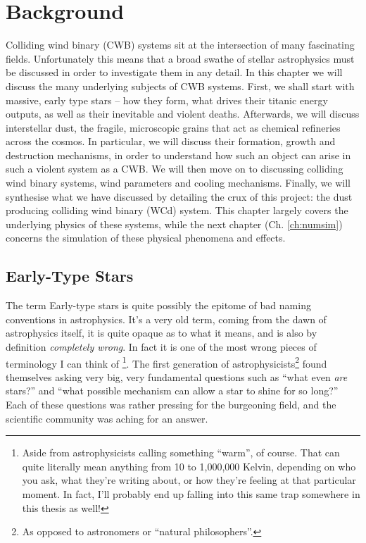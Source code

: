 \chapter{Background}
\label{ch:background}

Colliding wind binary (CWB) systems sit at the intersection of many fascinating fields.
Unfortunately this means that a broad swathe of stellar astrophysics must be discussed in order to investigate them in any detail.
In this chapter we will discuss the many underlying subjects of CWB systems.
First, we shall start with massive, early type stars -- how they form, what drives their titanic energy outputs, as well as their inevitable and violent deaths.
Afterwards, we will discuss interstellar dust, the fragile, microscopic grains that act as chemical refineries across the cosmos.
In particular, we will discuss their formation, growth and destruction mechanisms, in order to understand how such an object can arise in such a violent system as a CWB.
We will then move on to discussing colliding wind binary systems, wind parameters and cooling mechanisms.
Finally, we will synthesise what we have discussed by detailing the crux of this project: the dust producing colliding wind binary (WCd) system.
This chapter largely covers the underlying physics of these systems, while the next chapter (Ch. \ref{ch:numsim}) concerns the simulation of these physical phenomena and effects. 

\section{Early-Type Stars}
\label{sec:earlytype}
\label{sec:obtype}

The term Early-type stars is quite possibly the epitome of bad naming conventions in astrophysics.
It's a very old term, coming from the dawn of astrophysics itself, it is quite opaque as to what it means, and is also by definition \textit{completely wrong}.
In fact it is one of the most wrong pieces of terminology I can think of
\footnote{Aside from astrophysicists calling something ``warm'', of course. That can quite literally mean anything from 10 to 1,000,000 Kelvin, depending on who you ask, what they're writing about, or how they're feeling at that particular moment. In fact, I'll probably end up falling into this same trap somewhere in this thesis as well!}.
The first generation of astrophysicists\footnote{As opposed to astronomers or ``natural philosophers''.} found themselves asking very big, very fundamental questions such as ``what even \textit{are} stars?'' and ``what possible mechanism can allow a star to shine for so long?''
Each of these questions was rather pressing for the burgeoning field, and the scientific community was aching for an answer.

